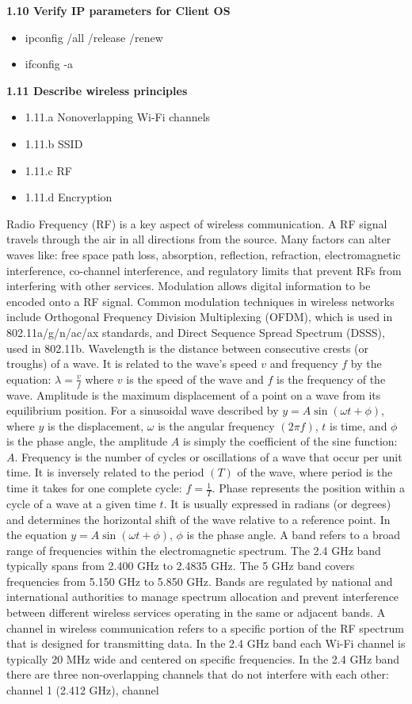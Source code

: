 \documentclass{article}
\begin{document}
\textbf{1.10 Verify IP parameters for Client OS}
\begin{itemize}
\item ipconfig /all /release /renew
\item ifconfig -a
\end{itemize}
 
\textbf{1.11 Describe wireless principles}
\begin{itemize}
\item 1.11.a Nonoverlapping Wi-Fi channels
\item 1.11.b SSID
\item 1.11.c RF
\item 1.11.d Encryption
\end{itemize}
  
	Radio Frequency (RF) is a key aspect of wireless communication. A RF signal travels through the air in all directions from the source. Many factors can alter waves like: free space path loss, absorption, reflection, refraction, electromagnetic interference, co-channel interference, and regulatory limits that prevent RFs from interfering with other services. Modulation allows digital information to be encoded onto a RF signal. Common modulation techniques in wireless networks include Orthogonal Frequency Division Multiplexing (OFDM), which is used in 802.11a/g/n/ac/ax standards, and Direct Sequence Spread Spectrum (DSSS), used in 802.11b. Wavelength is the distance between consecutive crests (or troughs) of a wave. It is related to the wave's speed $v$ and frequency $f$ by the equation: $\lambda = \frac{v}{f}$ where $v$ is the speed of the wave and $f$ is the frequency of the wave. Amplitude is the maximum displacement of a point on a wave from its equilibrium position. For a sinusoidal wave described by $y = A \sin(\omega t + \phi)$, where $y$ is the displacement, $\omega$ is the angular frequency $(2\pi f)$, $t$ is time, and $\phi$ is the phase angle, the amplitude $A$ is simply the coefficient of the sine function: $A$. Frequency is the number of cycles or oscillations of a wave that occur per unit time. It is inversely related to the period $(T)$ of the wave, where period is the time it takes for one complete cycle: $f = \frac{1}{T}$. Phase represents the position within a cycle of a wave at a given time $t$. It is usually expressed in radians (or degrees) and determines the horizontal shift of the wave relative to a reference point. In the equation $y = A \sin(\omega t + \phi)$, $\phi$ is the phase angle. A band refers to a broad range of frequencies within the electromagnetic spectrum. The 2.4 GHz band typically spans from 2.400 GHz to 2.4835 GHz. The 5 GHz band covers frequencies from 5.150 GHz to 5.850 GHz. Bands are regulated by national and international authorities to manage spectrum allocation and prevent interference between different wireless services operating in the same or adjacent bands. A channel in wireless communication refers to a specific portion of the RF spectrum that is designed for transmitting data. In the 2.4 GHz band each Wi-Fi channel is typically 20 MHz wide and centered on specific frequencies. In the 2.4 GHz band there are three non-overlapping channels that do not interfere with each other: channel 1 (2.412 GHz), channel 
\end{document}
